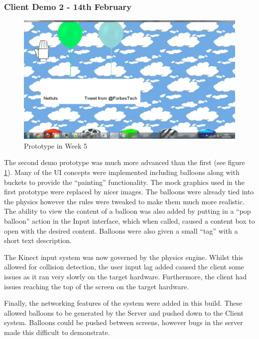 \subsubsection{Client Demo 2 - 14th February}
\begin{figure}[h]
\begin{centering}
\includegraphics[width=\textwidth]{Diagrams/Client-Log-W5.jpg}
\par\end{centering}

\caption{Prototype in Week 5}
\label{ScreenWeek5}
\end{figure}
The second demo prototype was much more advanced than the first (see figure 
\ref{ScreenWeek5}). Many of the UI concepts were implemented 
including balloons along with buckets to provide the ``painting'' functionality. 
The mock graphics used in the first prototype were replaced by nicer images. 
The balloons were already tied into the physics however the rules were tweaked to 
make them much more realistic. The ability to view the content of a balloon was 
also added by putting in a ``pop balloon'' action in the Input interface, which 
when called, caused a content box to open with the desired content. Balloons were 
also given a small ``tag'' with a short text description.

The Kinect input system was now governed by the physics engine. Whilst this 
allowed for collision detection, the user input lag added caused the client 
some issues as it ran very slowly on the target hardware. Furthermore, the
client had issues reaching the top of the screen on the target hardware.

Finally, the networking features of the system were added in this build. These
allowed balloons to be generated by the Server and pushed down to the Client 
system. Balloons could be pushed between screens, however bugs in the 
server made this difficult to demonstrate.

